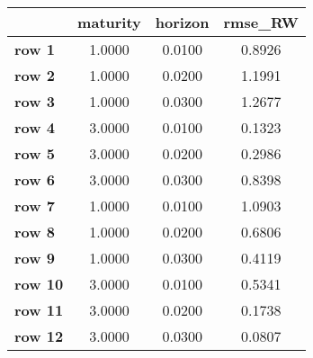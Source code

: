 \begin{tiny}\begin{tabular}{|l|c|c|c|}
\hline
&\textbf{maturity}&\textbf{horizon}&\textbf{rmse_RW}\\\hline
\textbf{row 1}&1.0000&0.0100&0.8926\\\hline
\textbf{row 2}&1.0000&0.0200&1.1991\\\hline
\textbf{row 3}&1.0000&0.0300&1.2677\\\hline
\textbf{row 4}&3.0000&0.0100&0.1323\\\hline
\textbf{row 5}&3.0000&0.0200&0.2986\\\hline
\textbf{row 6}&3.0000&0.0300&0.8398\\\hline
\textbf{row 7}&1.0000&0.0100&1.0903\\\hline
\textbf{row 8}&1.0000&0.0200&0.6806\\\hline
\textbf{row 9}&1.0000&0.0300&0.4119\\\hline
\textbf{row 10}&3.0000&0.0100&0.5341\\\hline
\textbf{row 11}&3.0000&0.0200&0.1738\\\hline
\textbf{row 12}&3.0000&0.0300&0.0807\\\hline
\end{tabular}
\end{tiny}